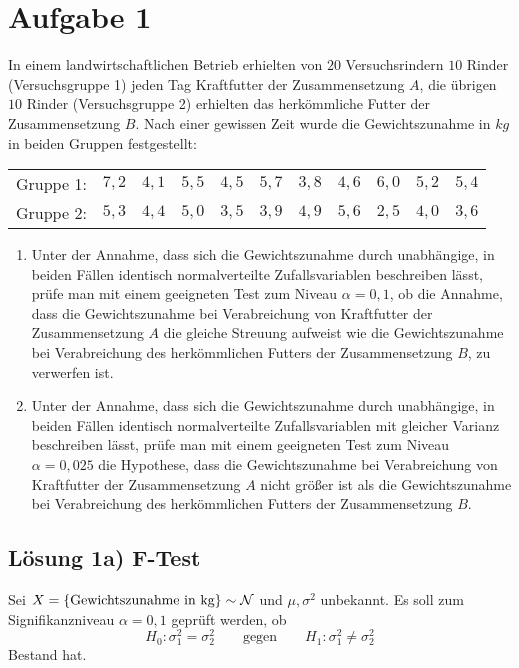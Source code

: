 \documentclass[main.tex]{subfiles}
\begin{document}
\section{Aufgabe 1}
In einem landwirtschaftlichen Betrieb erhielten von $20$ Versuchsrindern $10$ Rinder (Versuchsgruppe 1) jeden Tag Kraftfutter der Zusammensetzung $A$, die übrigen $10$ Rinder (Versuchsgruppe 2) erhielten das herkömmliche Futter der Zusammensetzung $B$. Nach einer gewissen Zeit wurde die Gewichtszunahme in $kg$ in beiden Gruppen festgestellt:
\begin{center}
	\begin{tabular}{ccccccccccc}
		Gruppe 1: & $7,2$ & $4,1$ & $5,5$ & $4,5$ & $5,7$ & $3,8$ & $4,6$ & $6,0$ & $5,2$ & $5,4$ \\
		Gruppe 2: & $5,3$ & $4,4$ & $5,0$ & $3,5$ & $3,9$ & $4,9$ & $5,6$ & $2,5$ & $4,0$ & $3,6$
	\end{tabular}
\end{center}
\begin{enumerate}
\item Unter der Annahme, dass sich die Gewichtszunahme durch unabhängige, in beiden Fällen identisch normalverteilte Zufallsvariablen beschreiben lässt, prüfe man mit einem geeigneten Test zum Niveau $\alpha = 0,1$, ob die Annahme, dass die Gewichtszunahme bei Verabreichung von Kraftfutter der Zusammensetzung $A$ die gleiche Streuung aufweist wie die Gewichtszunahme bei Verabreichung des herkömmlichen Futters der Zusammensetzung $B$, zu verwerfen ist.
\item Unter der Annahme, dass sich die Gewichtszunahme durch unabhängige, in beiden Fällen identisch normalverteilte Zufallsvariablen mit gleicher Varianz beschreiben lässt, prüfe man mit einem geeigneten Test zum Niveau $\alpha = 0,025$ die Hypothese, dass die Gewichtszunahme bei Verabreichung von Kraftfutter der Zusammensetzung $A$ nicht größer ist als die Gewichtszunahme bei Verabreichung des herkömmlichen Futters der Zusammensetzung $B$.
\end{enumerate}

\subsection{Lösung 1a) F-Test}

Sei $X =\{\text{Gewichtszunahme in kg}\} \sim \mathcal{N}$ und $\mu, \sigma^2$ unbekannt.
Es soll zum Signifikanzniveau $\alpha = 0,1$ geprüft werden, ob
$$
H_0: \sigma_1^2 = \sigma_2^2 \qquad \text{gegen} \qquad H_1: \sigma_1^2 \neq \sigma_2^2
$$
Bestand hat.\\
\end{document}
